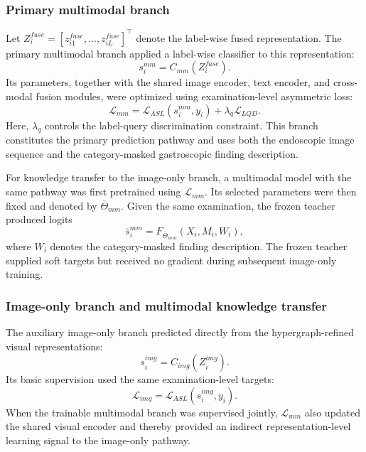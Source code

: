 \documentclass[Afour,sagev,times]{sagej}
\begin{document}
\subsubsection{Primary multimodal branch}

Let $Z_i^{fuse}=[z_{i1}^{fuse},\ldots,z_{iL}^{fuse}]^{\top}$ denote the label-wise fused representation. The primary multimodal branch applied a label-wise classifier to this representation:
\begin{equation}
s_i^{mm}=C_{mm}(Z_i^{fuse}).
\end{equation}
Its parameters, together with the shared image encoder, text encoder, and cross-modal fusion modules, were optimized using examination-level asymmetric loss:
\begin{equation}
\mathcal{L}_{mm}=\mathcal{L}_{ASL}(s_i^{mm},y_i)+\lambda_q\mathcal{L}_{LQD}.
\end{equation}
Here, $\lambda_q$ controls the label-query discrimination constraint.
This branch constitutes the primary prediction pathway and uses both the endoscopic image sequence and the category-masked gastroscopic finding description.

For knowledge transfer to the image-only branch, a multimodal model with the same pathway was first pretrained using $\mathcal{L}_{mm}$. Its selected parameters were then fixed and denoted by $\overline{\Theta}_{mm}$. Given the same examination, the frozen teacher produced logits
\begin{equation}
\overline{s}_i^{mm}=F_{\overline{\Theta}_{mm}}(X_i,M_i,W_i),
\end{equation}
where $W_i$ denotes the category-masked finding description. The frozen teacher supplied soft targets but received no gradient during subsequent image-only training.

\subsubsection{Image-only branch and multimodal knowledge transfer}

The auxiliary image-only branch predicted directly from the hypergraph-refined visual representations:
\begin{equation}
s_i^{img}=C_{img}(Z_i^{img}).
\end{equation}
Its basic supervision used the same examination-level targets:
\begin{equation}
\mathcal{L}_{img}=\mathcal{L}_{ASL}(s_i^{img},y_i).
\end{equation}
When the trainable multimodal branch was supervised jointly, $\mathcal{L}_{mm}$ also updated the shared visual encoder and thereby provided an indirect representation-level learning signal to the image-only pathway.
\end{document}
